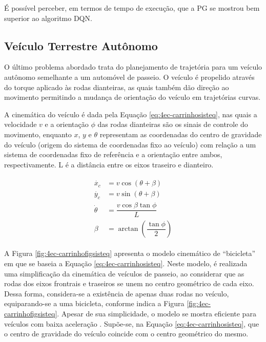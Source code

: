 
É possível perceber, em termos de tempo de execução, que a PG se mostrou bem superior ao algoritmo DQN.


\subsection{Veículo Terrestre Autônomo}\label{ssec:4ec-carrinho}

O último problema abordado trata do planejamento de trajetória para um veículo autônomo semelhante a um automóvel de passeio. O veículo é propelido através do torque aplicado às rodas dianteiras, as quais também dão direção ao movimento permitindo a mudança de orientação do veículo em trajetórias curvas.

A cinemática do veículo é dada pela Equação \ref{eq:4ec-carrinhosisteq}, nas quais a velocidade $v$ e a orientação $\phi$ das rodas dianteiras são os sinais de controle do movimento, enquanto $x$, $y$ e $\theta$ representam as coordenadas do centro de gravidade do veículo (origem do sistema de coordenadas fixo ao veículo) com relação a um sistema de coordenadas fixo de referência e a orientação entre ambos, respectivamente. L é a distância entre os eixos traseiro e dianteiro. 

\begin{align}\label{eq:4ec-carrinhosisteq}
\begin{split}
\dot{x_c}&=v\cos(\theta+\beta)\\
\dot{y_c}&=v\sin(\theta+\beta)\\
\dot{\theta}&=\dfrac{v\cos\beta\tan\phi}{L}\\
\beta&=\arctan\left(\dfrac{\tan\phi}{2}\right)
\end{split}
\end{align}

A Figura \ref{fig:4ec-carrinhofigsisteq} apresenta o modelo cinemático de ``bicicleta'' em que se baseia a Equação \ref{eq:4ec-carrinhosisteq}. Neste modelo, é realizada uma simplificação da cinemática de veículos de passeio, ao considerar que as rodas dos eixos frontrais e traseiros se unem no centro geométrico de cada eixo. Dessa forma, considera-se a existência de apenas duas rodas no veículo, equiparando-se a uma bicicleta, conforme indica a Figura \ref{fig:4ec-carrinhofigsisteq}. Apesar de sua simplicidade, o modelo se mostra eficiente para veículos com baixa aceleração \cite{bicicleta}. Supõe-se, na Equação \ref{eq:4ec-carrinhosisteq}, que o centro de gravidade do veículo coincide com o centro geométrico do mesmo.

